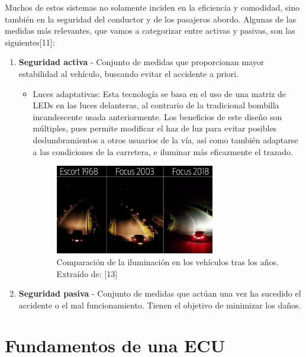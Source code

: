 Muchos de estos sistemas no solamente inciden en la eficiencia y comodidad, sino también en la seguridad del conductor y de los pasajeros abordo. Algunas de las medidas más relevantes, que vamos a categorizar entre activas y pasivas, son las siguientes[11]:

\begin{enumerate}
    \item \textbf{Seguridad activa} - Conjunto de medidas que proporcionan mayor estabilidad al vehículo, buscando evitar el accidente a priori.
    \begin{itemize}
        \item Luces adaptativas: Esta tecnología se basa en el uso de una matriz de LEDs en las luces delanteras, al contrario de la tradicional bombilla incandescente usada anteriormente. Los beneficios de este diseño son múltiples, pues permite modificar el haz de luz para evitar posibles deslumbramientos a otros usuarios de la vía, así como también adaptarse a las condiciones de la carretera, e iluminar más eficazmente el trazado.

        \begin{figure}[h]
            \centering
            \includegraphics[width=0.7\textwidth]{imagenes/adaptive_lights.png}
            \caption{Comparación de la iluminación en los vehículos tras los años. Extraído de: [13]}
        \end{figure}
     


    \end{itemize}

    \item \textbf{Seguridad pasiva} - Conjunto de medidas que actúan una vez ha sucedido el accidente o el mal funcionamiento. Tienen el objetivo de minimizar los daños.
\end{enumerate}




\section{Fundamentos de una ECU}
